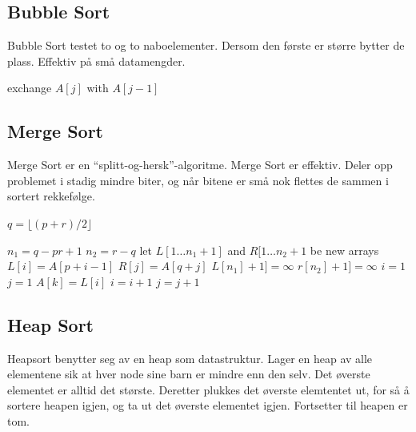 \documentclass[a4paper, norsk,  10pt]{article}
\begin{document}
{{\subsection{Bubble Sort}

Bubble Sort testet to og to naboelementer. Dersom den første er større bytter de plass. Effektiv på små datamengder. \\

\begin{algorithmic}
			\State exchange $A[j]$ with $A[j-1]$
		\EndIf
	\EndFor
\EndFor
\end{algorithmic}

\subsection{Merge Sort}

Merge Sort er en ``splitt-og-hersk''-algoritme. Merge Sort er effektiv. Deler opp problemet i stadig mindre biter, og når bitene er små nok flettes de sammen i sortert rekkefølge. \\

\begin{algorithmic}
		\State $q = \lfloor(p + r) / 2 \rfloor $ 
		\State {} 
		\State {}
		\State {} 
	 \EndIf
\EndFunction
\State 

\State ${n_{1}}=q-pr+1$
\State ${n_{2}}=r-q$
\State let $L[1 \dots {n_{1}} + 1]$ and $R[1 \dots {n_{2}+1}$ be new arrays
	\State $L[i] = A[p + i -1]$
\EndFor
{}
	\State $R[j] = A[q + j]$
\EndFor
\State $L[{n_{1}}] + 1] = \infty$
\State $r[{n_{2}}] + 1] = \infty$
\State $i = 1$
\State $j = 1$
		\State $A[k] = L[i]$
		\State $i = i + 1$
	\Else 
			\State $j = j + 1$
		\EndIf	
	\EndIf
\EndFor
\EndFunction
\end{algorithmic}

\subsection{Heap Sort}

Heapsort benytter seg av en heap som datastruktur. Lager en heap av alle elementene sik at hver node sine barn er mindre enn den selv. Det øverste elementet er alltid det største. Deretter plukkes det øverste elemtentet ut, for så å sortere heapen igjen, og ta ut det øverste elementet igjen. Fortsetter til heapen er tom.  \\

}}
\end{document}
